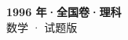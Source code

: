 \documentclass[zihao=-4, a4paper]{ctexart}
\begin{document}
\begin{center}
  {\Large\bfseries 1996 年·全国卷·理科}\\[4pt]
  {\large 数学 · 试题版}
\end{center}
\medskip
{}

\end{document}
